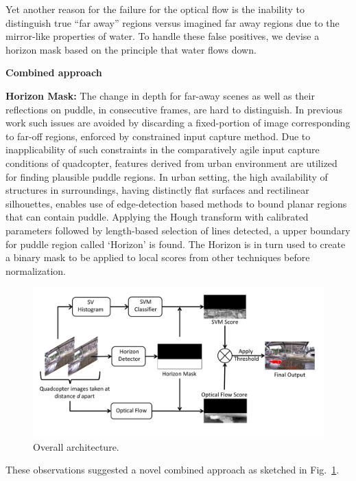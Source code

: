 \documentclass[11pt]{article}
\begin{document}
Yet another reason for the failure for the optical flow is the
inability to distinguish true ``far away'' regions versus imagined far
away regions due to the mirror-like properties of water.  To handle
these false positives, we devise a horizon mask based on the principle
that water flows down.
\vspace{0.5cm}

\noindent\textbf{Combined approach}

\textbf{Horizon Mask:} The change in depth for far-away scenes as well
as their reflections on puddle, in consecutive frames, are hard to
distinguish. In previous work \cite{rankin11} such issues are avoided
by discarding a fixed-portion of image corresponding to far-off
regions, enforced by constrained input capture method. Due to
inapplicability of such constraints in the comparatively agile input
capture conditions of quadcopter, features derived from urban
environment are utilized for finding plausible puddle regions. In
urban setting, the high availability of structures in surroundings,
having distinctly flat surfaces and rectilinear silhouettes, enables
use of edge-detection based methods to bound planar regions that can
contain puddle. Applying the Hough transform with calibrated
parameters followed by length-based selection of lines detected, a
upper boundary for puddle region called `Horizon' is found. The
Horizon is in turn used to create a binary mask to be applied to local
scores from other techniques before normalization.

\begin{figure}[h!]
  \centering
  \includegraphics[width=\textwidth]{stagnantWater/figures/overall_workflow.pdf}
  \caption{Overall architecture.}
  \label{fig:workflow}
\end{figure}

These observations suggested a novel combined approach as sketched
in Fig.~\ref{fig:workflow}.
\end{document}
